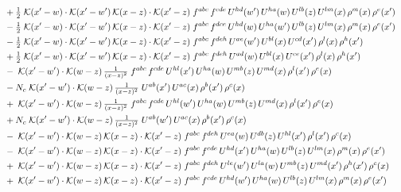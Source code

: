 \documentclass[10pt]{article}
\numberwithin{equation}{section}
\begin{document}
\begin{align}
&\quad +\tfrac{1}{2}\;\mathcal{K}(x'-w)\cdot\mathcal{K}(x'-w')\,\mathcal{K}(x-z)\cdot\mathcal{K}(x'-z)\;f^{abc}\,f^{cde}\,U^{hd}(w')\,U^{ha}(w)\,U^{lb}(z)\,U^{lm}(x)\,\rho^{m}(x)\,\rho^{e}(x')\notag\\
&\quad -\tfrac{1}{2}\;\mathcal{K}(x'-w)\cdot\mathcal{K}(x'-w')\,\mathcal{K}(x-z)\cdot\mathcal{K}(x'-z)\;f^{abc}\,f^{dce}\,U^{hd}(w)\,U^{ha}(w')\,U^{lb}(z)\,U^{lm}(x)\,\rho^{m}(x)\,\rho^{e}(x')\notag\\
&\quad -\tfrac{1}{2}\;\mathcal{K}(x'-w)\cdot\mathcal{K}(x'-w')\,\mathcal{K}(x-z)\cdot\mathcal{K}(x'-z)\;f^{abc}\,f^{deh}\,U^{ae}(w')\,U^{bl}(x)\,U^{cd}(x')\,\rho^{l}(x)\,\rho^{h}(x')\notag\\
&\quad +\tfrac{1}{2}\;\mathcal{K}(x'-w)\cdot\mathcal{K}(x'-w')\,\mathcal{K}(x-z)\cdot\mathcal{K}(x'-z)\;f^{abc}\,f^{deh}\,U^{ad}(w)\,U^{bl}(x)\,U^{ce}(x')\,\rho^{l}(x)\,\rho^{h}(x')\notag\\
&\quad -\;\mathcal{K}(x'-w')\cdot\mathcal{K}(w-z)\,\tfrac{1}{(x-z)^{2}}\;f^{abc}\,f^{cde}\,U^{hl}(x')\,U^{ha}(w)\,U^{mb}(z)\,U^{md}(x)\,\rho^{l}(x')\,\rho^{e}(x)\notag\\
&\quad -N_c\;\mathcal{K}(x'-w')\cdot\mathcal{K}(w-z)\,\tfrac{1}{(x-z)^{2}}\;U^{ab}(x')\,U^{ac}(x)\,\rho^{b}(x')\,\rho^{c}(x)\notag\\
&\quad +\;\mathcal{K}(x'-w')\cdot\mathcal{K}(w-z)\,\tfrac{1}{(x-z)^{2}}\;f^{abc}\,f^{cde}\,U^{hl}(w')\,U^{ha}(w)\,U^{mb}(z)\,U^{md}(x)\,\rho^{l}(x')\,\rho^{e}(x)\notag\\
&\quad +N_c\;\mathcal{K}(x'-w')\cdot\mathcal{K}(w-z)\,\tfrac{1}{(x-z)^{2}}\;U^{ab}(w')\,U^{ac}(x)\,\rho^{b}(x')\,\rho^{c}(x)\notag\\
&\quad -\;\mathcal{K}(x'-w')\cdot\mathcal{K}(w-z)\,\mathcal{K}(x-z)\cdot\mathcal{K}(x'-z)\;f^{abc}\,f^{deh}\,U^{ea}(w)\,U^{db}(z)\,U^{hl}(x')\,\rho^{l}(x')\,\rho^{c}(x)\notag\\
&\quad -\;\mathcal{K}(x'-w')\cdot\mathcal{K}(w-z)\,\mathcal{K}(x-z)\cdot\mathcal{K}(x'-z)\;f^{abc}\,f^{cde}\,U^{hd}(x')\,U^{ha}(w)\,U^{lb}(z)\,U^{lm}(x)\,\rho^{m}(x)\,\rho^{e}(x')\notag\\
&\quad +\;\mathcal{K}(x'-w')\cdot\mathcal{K}(w-z)\,\mathcal{K}(x-z)\cdot\mathcal{K}(x'-z)\;f^{abc}\,f^{deh}\,U^{le}(w')\,U^{la}(w)\,U^{mb}(z)\,U^{md}(x')\,\rho^{h}(x')\,\rho^{c}(x)\notag\\
&\quad +\;\mathcal{K}(x'-w')\cdot\mathcal{K}(w-z)\,\mathcal{K}(x-z)\cdot\mathcal{K}(x'-z)\;f^{abc}\,f^{cde}\,U^{hd}(w')\,U^{ha}(w)\,U^{lb}(z)\,U^{lm}(x)\,\rho^{m}(x)\,\rho^{e}(x')\notag\\

\end{align}
\end{document}
